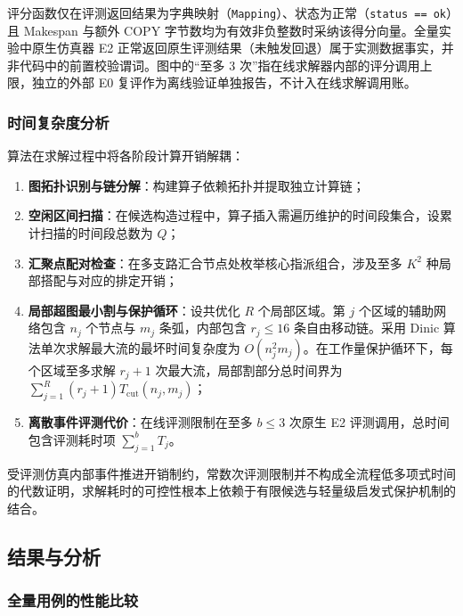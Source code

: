 \documentclass[anonymous,withtoc]{gmcm2026}
\providecommand{\tightlist}{\setlength{\itemsep}{0pt}\setlength{\parskip}{0pt}}
\begin{document}
评分函数仅在评测返回结果为字典映射（\texttt{Mapping}）、状态为正常（\texttt{status\ ==\ \textquotesingle{}ok\textquotesingle{}}）且 Makespan 与额外 COPY 字节数均为有效非负整数时采纳该得分向量。全量实验中原生仿真器 E2 正常返回原生评测结果（未触发回退）属于实测数据事实，并非代码中的前置校验谓词。图中的``至多 3 次''指在线求解器内部的评分调用上限，独立的外部 E0 复评作为离线验证单独报告，不计入在线求解调用账。

\subsubsection{时间复杂度分析}

算法在求解过程中将各阶段计算开销解耦：

\begin{enumerate}
\def\labelenumi{\arabic{enumi}.}
\tightlist
\item
  \textbf{图拓扑识别与链分解}：构建算子依赖拓扑并提取独立计算链；
\item
  \textbf{空闲区间扫描}：在候选构造过程中，算子插入需遍历维护的时间段集合，设累计扫描的时间段总数为 \(Q\)；
\item
  \textbf{汇聚点配对检查}：在多支路汇合节点处枚举核心指派组合，涉及至多 \(K^2\) 种局部搭配与对应的排定开销；
\item
  \textbf{局部超图最小割与保护循环}：设共优化 \(R\) 个局部区域。第 \(j\) 个区域的辅助网络包含 \(n_j\) 个节点与 \(m_j\) 条弧，内部包含 \(r_j \le 16\) 条自由移动链。采用 Dinic 算法\cite{ref9}单次求解最大流的最坏时间复杂度为 \(O(n_j^2 m_j)\)。在工作量保护循环下，每个区域至多求解 \(r_j + 1\) 次最大流，局部割部分总时间界为 \(\sum_{j=1}^R (r_j + 1) T_{\mathrm{cut}}(n_j, m_j)\)；
\item
  \textbf{离散事件评测代价}：在线评测限制在至多 \(b \le 3\) 次原生 E2 评测调用，总时间包含评测耗时项 \(\sum_{j=1}^b T_j\)。
\end{enumerate}

受评测仿真内部事件推进开销制约，常数次评测限制并不构成全流程低多项式时间的代数证明，求解耗时的可控性根本上依赖于有限候选与轻量级启发式保护机制的结合。

\subsection{结果与分析}

\subsubsection{全量用例的性能比较}
\end{document}
